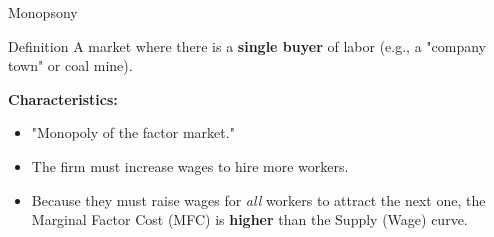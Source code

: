 \documentclass[aspectratio=169]{beamer}
\begin{document}
\begin{frame}{Monopsony}
    \begin{block}{Definition}
        A market where there is a \textbf{single buyer} of labor (e.g., a "company town" or coal mine).
    \end{block}

    \textbf{Characteristics:}
    \begin{itemize}
        \item "Monopoly of the factor market."
        \item The firm must increase wages to hire more workers.
        \item Because they must raise wages for \textit{all} workers to attract the next one, the Marginal Factor Cost (MFC) is \textbf{higher} than the Supply (Wage) curve.
    \end{itemize}
\end{frame}
\end{document}
